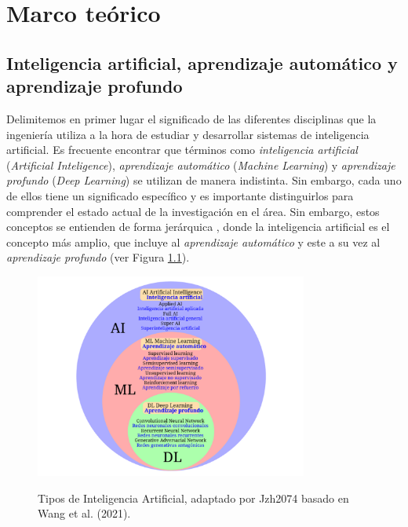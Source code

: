 \chapter{Marco teórico}

\section{Inteligencia artificial, aprendizaje automático y aprendizaje profundo}

Delimitemos en primer lugar el significado de las diferentes disciplinas que la ingeniería utiliza a la hora de estudiar y desarrollar sistemas de inteligencia artificial. Es frecuente encontrar que términos como \textit{inteligencia artificial} (\textit{Artificial Inteligence}), \textit{aprendizaje automático} (\textit{Machine Learning}) y \textit{aprendizaje profundo} (\textit{Deep Learning}) se utilizan de manera indistinta. Sin embargo, cada uno de ellos tiene un significado específico y es importante distinguirlos para comprender el estado actual de la investigación en el área. Sin embargo, estos conceptos se entienden de forma jerárquica \cite{}, donde la inteligencia artificial es el concepto más amplio, que incluye al \textit{aprendizaje automático} y este a su vez al \textit{aprendizaje profundo} (ver Figura \ref{fig:ai_types}).


\begin{figure}[]
    \caption[Tipos de Inteligencia Artificial]{Tipos de Inteligencia Artificial, adaptado por Jzh2074 basado en Wang et al. (2021).}
    \centering
    \includegraphics[width=0.8\textwidth]{./figuras/Tipos_Inteligencia_Artificial.png}
    \label{fig:ai_types}
\end{figure}


